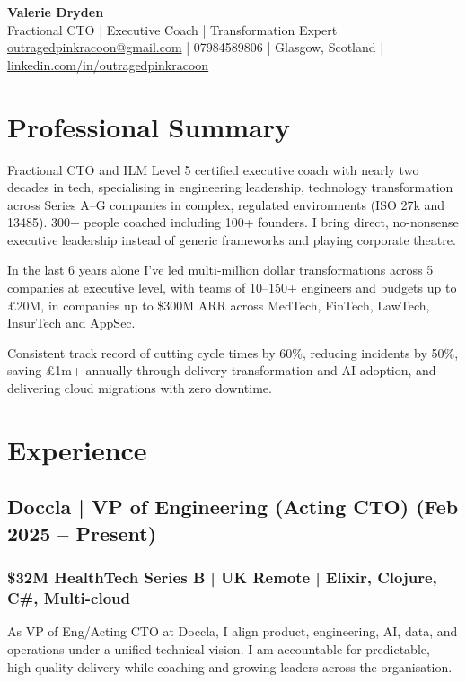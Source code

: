 \documentclass[12pt]{article}
\begin{document}
\begin{center}
  {\Huge\bfseries Valerie Dryden}\\[2pt]
  {\large Fractional CTO | Executive Coach | Transformation Expert}\\[6pt]
  {\small
    \href{mailto:outragedpinkracoon@gmail.com}{outragedpinkracoon@gmail.com} |
    07984589806 |
    Glasgow, Scotland |
    \href{https://www.linkedin.com/in/outragedpinkracoon}{linkedin.com/in/outragedpinkracoon}
  }
\end{center}
\vspace{0.5em}

\section*{Professional Summary}
Fractional CTO and ILM Level 5 certified executive coach with nearly two decades in tech, specialising in engineering leadership, technology transformation across Series A–G companies in complex, regulated environments (ISO 27k and 13485). 300+ people coached including 100+ founders. I bring direct, no-nonsense executive leadership instead of generic frameworks and playing corporate theatre.

In the last 6 years alone I've led multi-million dollar transformations across 5 companies at executive level, with teams of 10–150+ engineers and budgets up to £20M, in companies up to \$300M ARR across MedTech, FinTech, LawTech, InsurTech and AppSec.

Consistent track record of cutting cycle times by 60\%, reducing incidents by 50\%, saving £1m+ annually through delivery transformation and AI adoption, and delivering cloud migrations with zero downtime.

\section*{Experience}

\subsection*{Doccla | VP of Engineering (Acting CTO) \small (Feb 2025 -- Present)}
\subsubsection*{\$32M HealthTech Series B | UK Remote | Elixir, Clojure, C\#, Multi-cloud}

As VP of Eng/Acting CTO at Doccla, I align product, engineering, AI, data, and operations under a unified technical vision. I am accountable for predictable, high-quality delivery while coaching and growing leaders across the organisation.
\end{document}
